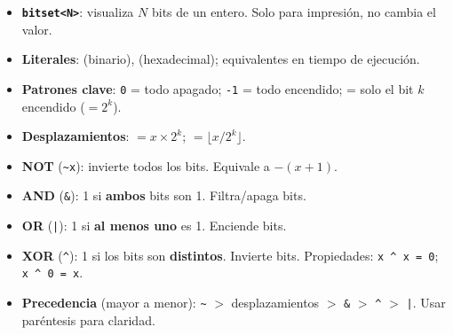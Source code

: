 \documentclass[12pt, oneside]{article}
\begin{document}
\begin{recuerda}
\begin{itemize}
  \item \textbf{\texttt{bitset<N>}}: visualiza $N$ bits de un entero.
        Solo para impresión, no cambia el valor.
  \item \textbf{Literales}:  (binario),  (hexadecimal);
        equivalentes en tiempo de ejecución.
  \item \textbf{Patrones clave}: \texttt{0} = todo apagado;
        \texttt{-1} = todo encendido;
         = solo el bit $k$ encendido ($= 2^k$).
  \item \textbf{Desplazamientos}:
         $= x \times 2^k$;
        \quad {} $= \lfloor x / 2^k \rfloor$.
  \item \textbf{NOT} (\texttt{\textasciitilde{}x}):
        invierte todos los bits. Equivale a $-(x+1)$.
  \item \textbf{AND} (\texttt{\&}):
        1 si \textbf{ambos} bits son 1. Filtra/apaga bits.
  \item \textbf{OR} (\texttt{|}):
        1 si \textbf{al menos uno} es 1. Enciende bits.
  \item \textbf{XOR} (\texttt{\textasciicircum}):
        1 si los bits son \textbf{distintos}. Invierte bits.
        Propiedades: \texttt{x \textasciicircum{} x = 0};
        \quad \texttt{x \textasciicircum{} 0 = x}.
  \item \textbf{Precedencia} (mayor a menor):
        \texttt{\textasciitilde} $>$
        desplazamientos $>$
        \texttt{\&} $>$
        \texttt{\textasciicircum} $>$
        \texttt{|}. Usar paréntesis para claridad.
\end{itemize}
\end{recuerda}
\end{document}
